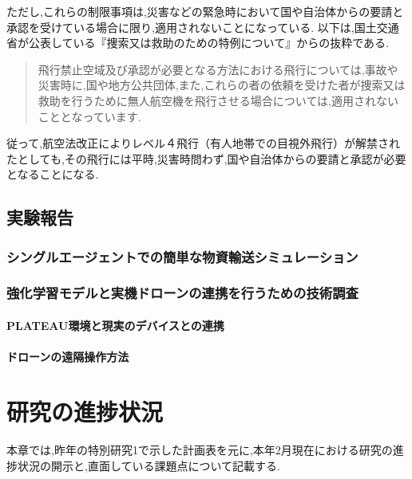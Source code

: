 \documentclass{article}[jsarticle]
\begin{document}
ただし,これらの制限事項は,災害などの緊急時において国や自治体からの要請と承認を受けている場合に限り,適用されないことになっている.
以下は,国土交通省が公表している『捜索又は救助のための特例について』からの抜粋である.
\begin{quote}
    飛行禁止空域及び承認が必要となる方法における飛行については,事故や災害時に,国や地方公共団体,また,これらの者の依頼を受けた者が捜索又は救助を行うために無人航空機を飛行させる場合については,適用されないこととなっています.
\end{quote}
従って,航空法改正によりレベル４飛行（有人地帯での目視外飛行）が解禁されたとしても,その飛行には平時,災害時問わず,国や自治体からの要請と承認が必要となることになる.

\subsection{実験報告}
\subsubsection{シングルエージェントでの簡単な物資輸送シミュレーション}
\subsubsection{強化学習モデルと実機ドローンの連携を行うための技術調査}
\paragraph{PLATEAU環境と現実のデバイスとの連携}
\paragraph{ドローンの遠隔操作方法}


\section{研究の進捗状況}
本章では,昨年の特別研究1で示した計画表を元に,本年2月現在における研究の進捗状況の開示と,直面している課題点について記載する.
\end{document}
